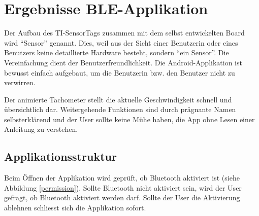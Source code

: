 \section{Ergebnisse BLE-Applikation}

Der Aufbau des TI-SensorTags zusammen mit dem selbst entwickelten Board wird ``Sensor'' genannt. Dies, weil aus der Sicht einer Benutzerin oder eines Benutzers keine detaillierte Hardware besteht, sondern ``ein Sensor''. Die Vereinfachung dient der Benutzerfreundlichkeit. Die Android-Applikation ist bewusst einfach aufgebaut, um die Benutzerin bzw. den Benutzer nicht zu verwirren. 

Der animierte Tachometer stellt die aktuelle Geschwindigkeit schnell und übersichtlich dar. Weitergehende Funktionen sind durch prägnante Namen selbsterklärend und der User sollte keine Mühe haben, die App ohne Lesen einer Anleitung zu verstehen.

\subsection{Applikationsstruktur}

Beim Öffnen der Applikation wird geprüft, ob Bluetooth aktiviert ist (siehe Abbildung \ref{permission}). Sollte Bluetooth nicht aktiviert sein, wird der User gefragt, ob Bluetooth aktiviert werden darf. Sollte der User die Aktivierung ablehnen schliesst sich die Applikation sofort.

